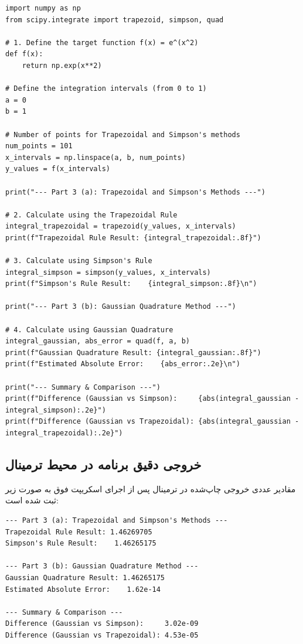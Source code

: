 \begin{latin}
\begin{lstlisting}
import numpy as np
from scipy.integrate import trapezoid, simpson, quad

# 1. Define the target function f(x) = e^(x^2)
def f(x):
    return np.exp(x**2)

# Define the integration intervals (from 0 to 1)
a = 0
b = 1

# Number of points for Trapezoidal and Simpson's methods
num_points = 101
x_intervals = np.linspace(a, b, num_points)
y_values = f(x_intervals)

print("--- Part 3 (a): Trapezoidal and Simpson's Methods ---")

# 2. Calculate using the Trapezoidal Rule
integral_trapezoidal = trapezoid(y_values, x_intervals)
print(f"Trapezoidal Rule Result: {integral_trapezoidal:.8f}")

# 3. Calculate using Simpson's Rule
integral_simpson = simpson(y_values, x_intervals)
print(f"Simpson's Rule Result:    {integral_simpson:.8f}\n")

print("--- Part 3 (b): Gaussian Quadrature Method ---")

# 4. Calculate using Gaussian Quadrature
integral_gaussian, abs_error = quad(f, a, b)
print(f"Gaussian Quadrature Result: {integral_gaussian:.8f}")
print(f"Estimated Absolute Error:    {abs_error:.2e}\n")

print("--- Summary & Comparison ---")
print(f"Difference (Gaussian vs Simpson):     {abs(integral_gaussian - integral_simpson):.2e}")
print(f"Difference (Gaussian vs Trapezoidal): {abs(integral_gaussian - integral_trapezoidal):.2e}")
\end{lstlisting}
\end{latin}

\subsection{خروجی دقیق برنامه در محیط ترمینال}
مقادیر عددی خروجی چاپ‌شده در ترمینال پس از اجرای اسکریپت فوق به صورت زیر ثبت شده است:

\begin{latin}
\begin{verbatim}
--- Part 3 (a): Trapezoidal and Simpson's Methods ---
Trapezoidal Rule Result: 1.46269705
Simpson's Rule Result:    1.46265175

--- Part 3 (b): Gaussian Quadrature Method ---
Gaussian Quadrature Result: 1.46265175
Estimated Absolute Error:    1.62e-14

--- Summary & Comparison ---
Difference (Gaussian vs Simpson):     3.02e-09
Difference (Gaussian vs Trapezoidal): 4.53e-05
\end{verbatim}
\end{latin}

